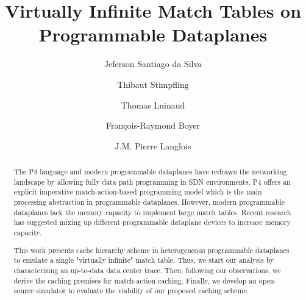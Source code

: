 \documentclass[sigconf,natbib=false,anonymous=false,screen]{acmart}
\begin{document}
\title{Virtually Infinite Match Tables on Programmable Dataplanes}

\author{Jeferson Santiago da Silva}


\author{Thibaut Stimpfling}

\author{Thomas Luinaud}

\author{Fran\c{c}ois-Raymond Boyer}


\author{J.M. Pierre Langlois}




\begin{abstract}
The P4 language and modern programmable dataplanes have redrawn the networking landscape by allowing fully data path programming in SDN environments.
P4 offers an explicit imperative match-action-based programming model which is the main processing abstraction in programmable dataplanes.
However, modern programmable dataplanes lack the memory capacity to implement large match tables.
Recent research has suggested mixing up different programmable dataplane devices to increase memory capacity.

This work presents cache hierarchy scheme in heterogeneous programmable dataplanes to emulate a single "virtually infinite" match table.
Thus, we start our analysis by characterizing an up-to-data data center trace.
Then, following our observations, we derive the caching premises for match-action caching.
Finally, we develop an open-source simulator to evaluate the viability of our proposed caching scheme.

\end{abstract}
\end{document}
